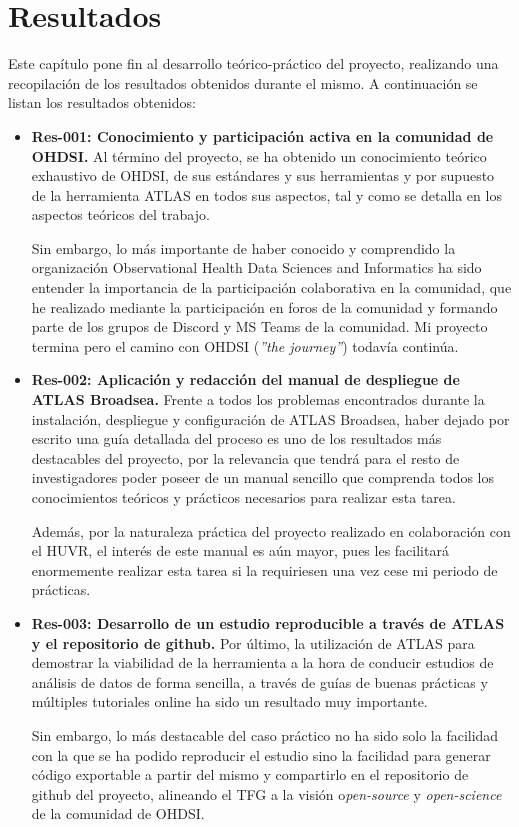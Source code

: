 \chapter{Resultados}\label{cap:10resultados}

Este capítulo pone fin al desarrollo teórico-práctico del proyecto, realizando una recopilación de los resultados obtenidos durante el mismo. A continuación se listan los resultados obtenidos:

\begin{itemize}

    \item \textbf{Res-001: Conocimiento y participación activa en la comunidad de OHDSI.} Al término del proyecto, se ha obtenido un conocimiento teórico exhaustivo de OHDSI, de sus estándares y sus herramientas y por supuesto de la herramienta ATLAS en todos sus aspectos, tal y como se detalla en los aspectos teóricos del trabajo.
    
    Sin embargo, lo más importante de haber conocido y comprendido la organización Observational Health Data Sciences and Informatics ha sido entender la importancia de la participación colaborativa en la comunidad, que he realizado mediante la participación en foros de la comunidad \parencite{OHDSIforums} y formando parte de los grupos de Discord \parencite{OHDSIdiscordInvitation} y MS Teams de la comunidad. Mi proyecto termina pero el camino con OHDSI (\textit{''the journey''}) todavía continúa.
    
    \item \textbf{Res-002: Aplicación y redacción del manual de despliegue de ATLAS Broadsea.} Frente a todos los problemas encontrados durante la instalación, despliegue y configuración de ATLAS Broadsea, haber dejado por escrito una guía detallada del proceso es uno de los resultados más destacables del proyecto, por la relevancia que tendrá para el resto de investigadores poder poseer de un manual sencillo que comprenda todos los conocimientos teóricos y prácticos necesarios para realizar esta tarea.

    Además, por la naturaleza práctica del proyecto realizado en colaboración con el HUVR, el interés de este manual es aún mayor, pues les facilitará enormemente realizar esta tarea si la requiriesen una vez cese mi periodo de prácticas. 

    \item \textbf{Res-003: Desarrollo de un estudio reproducible a través de ATLAS y el repositorio de github.} Por último, la utilización de ATLAS para demostrar la viabilidad de la herramienta a la hora de conducir estudios de análisis de datos de forma sencilla, a través de guías de buenas prácticas y múltiples tutoriales online ha sido un resultado muy importante. 

    Sin embargo, lo más destacable del caso práctico no ha sido solo la facilidad con la que se ha podido reproducir el estudio sino la facilidad para generar código exportable a partir del mismo y compartirlo en el repositorio de github del proyecto, alineando el TFG a la visión o\textit{pen-source} y \textit{open-science} de la comunidad de OHDSI. 

\end{itemize}

